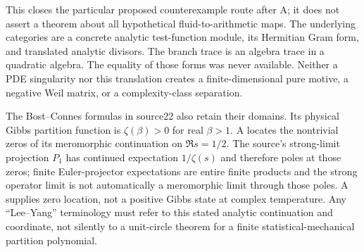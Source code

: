 This closes the particular proposed counterexample route after A; it does
not assert a theorem about all hypothetical fluid-to-arithmetic maps.
The underlying categories are a concrete analytic test-function module,
its Hermitian Gram form, and translated analytic divisors. The branch
trace is an algebra trace in a quadratic algebra. The equality of those
forms was never available. Neither a PDE singularity nor this translation
creates a finite-dimensional pure motive, a negative Weil matrix, or a
complexity-class separation.

The Bost--Connes formulas in source22 also retain their domains. Its
physical Gibbs partition function is $\zeta(\beta)>0$ for real
$\beta>1$. A locates the nontrivial zeros of its meromorphic continuation
on $\Re s=1/2$. The source's strong-limit projection $P_1$ has continued
expectation $1/\zeta(s)$ and therefore poles at those zeros; finite
Euler-projector expectations are entire finite products and the strong
operator limit is not automatically a meromorphic limit through those
poles. A supplies zero location, not a positive Gibbs state at complex
temperature. Any ``Lee--Yang'' terminology must refer to this stated
analytic continuation and coordinate, not silently to a unit-circle
theorem for a finite statistical-mechanical partition polynomial.

